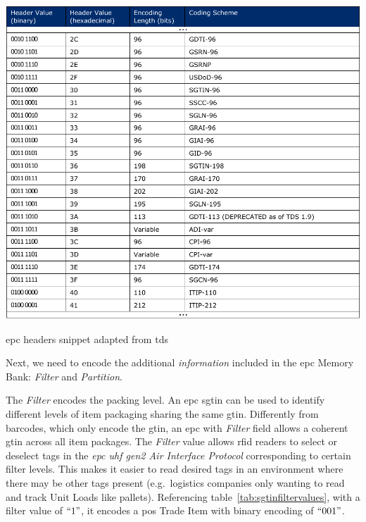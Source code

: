 \begin{table}[]
    \centering
    \includegraphics[width=\textwidth]{./figs/02-state-of-the-art/table_epcheaders.pdf}
    \caption[\ac{epc} headers snippet]{\ac{epc} headers snippet adapted from \ac{tds}~\cite{EPCTagData}} 
    \label{tab:epcheaders}
\end{table}

Next, we need to encode the additional \textit{information} included in the \ac{epc} Memory Bank: \emph{Filter} and \emph{Partition}. 

The \emph{Filter} encodes the packing level. An \ac{epc} \ac{sgtin} can be used to identify different levels of item packaging sharing the same \ac{gtin}. Differently from barcodes, which only encode the \ac{gtin}, an \ac{epc} with \emph{Filter} field allows a coherent \ac{gtin} across all item packages.
The \emph{Filter} value allows \ac{rfid} readers to select or deselect tags in the \emph{\ac{epc} \ac{uhf} \ac{gen2} Air Interface Protocol} corresponding to certain filter levels. This makes it easier to read desired tags in an environment where there may be other tags present (e.g.\ logistics companies only wanting to read and track Unit Loads like pallets).
Referencing table~\ref{tab:sgtinfiltervalues}, with a filter value of $``1"$, it encodes a \ac{pos} Trade Item with binary encoding of $``001"$.

